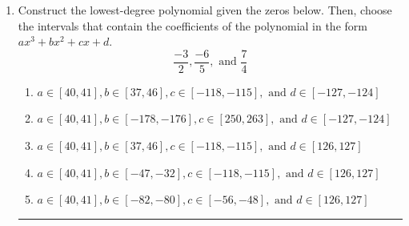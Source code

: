 \documentclass[14pt]{extbook}
\newcommand{\litem}[1]{\item#1\hspace*{-1cm}\rule{\textwidth}{0.4pt}}
\begin{document}
\begin{enumerate}
\litem{
Construct the lowest-degree polynomial given the zeros below. Then, choose the intervals that contain the coefficients of the polynomial in the form $ax^3+bx^2+cx+d$.\[ \frac{-3}{2}, \frac{-6}{5}, \text{ and } \frac{7}{4} \]\begin{enumerate}[label=\Alph*.]
\item \( a \in [40, 41], b \in [37, 46], c \in [-118, -115], \text{ and } d \in [-127, -124] \)
\item \( a \in [40, 41], b \in [-178, -176], c \in [250, 263], \text{ and } d \in [-127, -124] \)
\item \( a \in [40, 41], b \in [37, 46], c \in [-118, -115], \text{ and } d \in [126, 127] \)
\item \( a \in [40, 41], b \in [-47, -32], c \in [-118, -115], \text{ and } d \in [126, 127] \)
\item \( a \in [40, 41], b \in [-82, -80], c \in [-56, -48], \text{ and } d \in [126, 127] \)


\end{enumerate}}
\end{enumerate}
\end{document}

